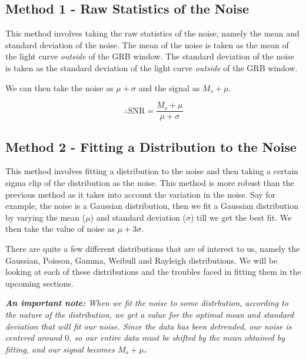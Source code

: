 \documentclass[11pt]{book} %
\begin{document}
\subsection{Method 1 - Raw Statistics of the Noise}

This method involves taking the raw statistics of the noise, namely the mean and standard deviation of the noise. The mean of the noise is taken as the mean of the light curve \textit{outside} of the GRB window. The standard deviation of the noise is taken as the standard deviation of the light curve \textit{outside} of the GRB window.

We can then take the noise as $\mu+\sigma$ and the signal as $M_s+\mu$. 

\begin{equation}
    \therefore \text{SNR} = \frac{M_s+\mu}{\mu+\sigma}
\end{equation}

\subsection{Method 2 - Fitting a Distribution to the Noise} \label{sec:method2}

This method involves fitting a distribution to the noise and then taking a certain sigma clip of the distribution as the noise. This method is more robust than the previous method as it takes into account the variation in the noise. Say for example, the noise is a Gaussian distribution, then we fit a Gaussian distribution by varying the mean ($\mu$) and standard deviation ($\sigma$) till we get the best fit. We then take the value of noise as $\mu+3\sigma$. 

There are quite a few different distributions that are of interest to us, namely the Gaussian, Poisson, Gamma, Weibull and Rayleigh distributions. We will be looking at each of these distributions and the troubles faced in fitting them in the upcoming sections.

\vspace{2cm}

\textit{\textbf{An important note:} When we fit the noise to some distrbution, according to the nature of the distribution, we get a value for the optimal mean and standard deviation that will fit our noise. Since the data has been detrended, our noise is centered around $0$, so our entire data must be shifted by the mean obtained by fitting, and our signal becomes \textbf{$M_s+\mu$.}}


\newpage
\end{document}
